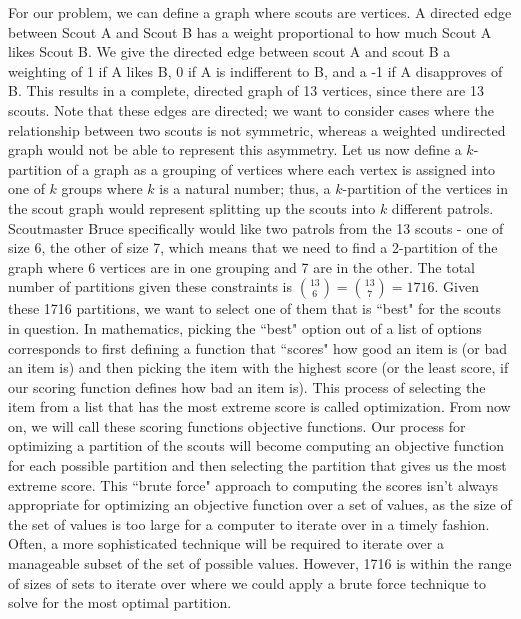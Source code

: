 \documentclass{amsart}
\theoremstyle{definition}
\theoremstyle{remark}
\numberwithin{equation}{section}
\begin{document}
For our problem, we can define a graph where scouts are vertices. A directed edge between Scout A and Scout B has a weight proportional to how much Scout A likes Scout B. We give the directed edge between scout A and scout B a weighting of 1 if A likes B, 0 if A is indifferent to B, and a -1 if A disapproves of B. This results in a complete, directed graph of 13 vertices, since there are 13 scouts. Note that these edges are directed; we want to consider cases where the relationship between two scouts is not symmetric, whereas a weighted undirected graph would not be able to represent this asymmetry. Let us now define a $k$-partition of a graph as a grouping of vertices where each vertex is assigned into one of $k$ groups where $k$ is a natural number; thus, a $k$-partition of the vertices in the scout graph would represent splitting up the scouts into $k$ different patrols. Scoutmaster Bruce specifically would like two patrols from the 13 scouts - one of size 6, the other of size 7, which means that we need to find a 2-partition of the graph where 6 vertices are in one grouping and 7 are in the other. The total number of partitions given these constraints is $\binom{13}{6} = \binom{13}{7} = 1716$. Given these 1716 partitions, we want to select one of them that is ``best" for the scouts in question. In mathematics, picking the ``best" option out of a list of options corresponds to first defining a function that ``scores" how good an item is (or bad an item is) and then picking the item with the highest score (or the least score, if our scoring function defines how bad an item is). This process of selecting the item from a list that has the most extreme score is called optimization. From now on, we will call these scoring functions objective functions. Our process for optimizing a partition of the scouts will become computing an objective function for each possible partition and then selecting the partition that gives us the most extreme score. This ``brute force" approach to computing the scores isn't always appropriate for optimizing an objective function over a set of values, as the size of the set of values is too large for a computer to iterate over in a timely fashion. Often, a more sophisticated technique will be required to iterate over a manageable subset of the set of possible values. However, 1716 is within the range of sizes of sets to iterate over where we could apply a brute force technique to solve for the most optimal partition.
\end{document}
